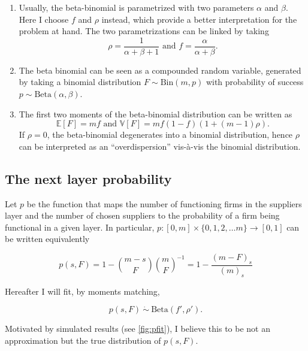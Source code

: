 \documentclass[american, abstract=on]{scrartcl}
\theoremstyle{plain}
\newcommand{\E}{\mathbb{E}}
\newcommand{\V}{\mathbb{V}}
\newcommand{\Beta}{\text{Beta}}
\newcommand{\Bin}{\text{Bin}}
\begin{document}
\begin{enumerate}
    \item Usually, the beta-binomial is parametrized with two parameters $\alpha$ and $\beta$. Here I choose $f$ and $\rho$ instead, which provide a better interpretation for the problem at hand. The two parametrizations can be linked by taking \begin{equation}
        \rho = \frac{1}{\alpha + \beta + 1} \text{ and } f = \frac{\alpha}{\alpha + \beta}.
    \end{equation}
    \item The beta binomial can be seen as a compounded random variable, generated by taking a binomial distribution $F \sim \Bin(m, p)$ with probability of success $p \sim \Beta(\alpha, \beta)$.
    \item The first two moments of the beta-binomial distribution can be written as \begin{equation}
        \E[F] = m f \text{ and } \V[F] = m f (1 - f) (1 + (m - 1) \rho).
    \end{equation} If $\rho = 0$, the beta-binomial degenerates into a binomial distribution, hence $\rho$ can be interpreted as an ``overdispersion'' vis-à-vis the binomial distribution.
\end{enumerate}

\subsection{The next layer probability}

Let $p$ be the function that maps the number of functioning firms in the suppliers layer and the number of chosen suppliers to the probability of a firm being functional in a given layer. In particular, $p: [0, m] \times \{0, 1, 2, \ldots m\} \to [0, 1]$ can be written equivalently

\begin{equation}
    p(s, F) = 1 - \binom{m - s}{F} \binom{m}{F}^{-1} = 1 - \frac{(m - F)_s}{(m)_s}
\end{equation}

Hereafter I will fit, by moments matching,

\begin{equation}
    p(s, F) \ \dot{\sim} \ \Beta(f', \rho').
\end{equation}

Motivated by simulated results (see \ref{fig:pfit}), I believe this to be not an approximation but the true distribution of $p(s, F)$. 
\end{document}
